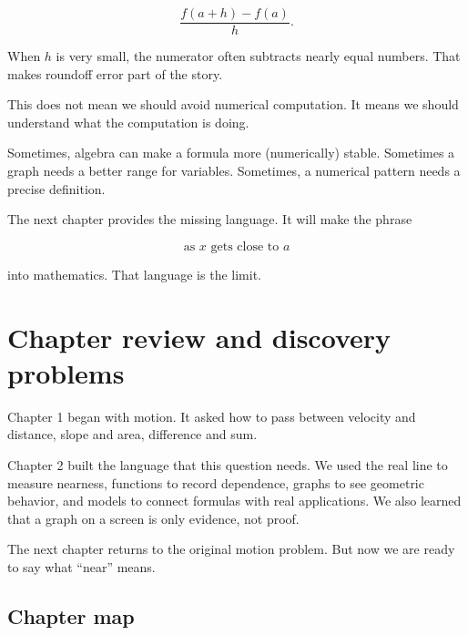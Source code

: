 \[
\frac{f(a+h)-f(a)}{h}.
\]

When \(h\) is very small, the numerator often subtracts nearly equal numbers. That makes roundoff error part of the story.

This does not mean we should avoid numerical computation. It means we should understand what the computation is doing.

Sometimes, algebra can make a formula more (numerically) stable. Sometimes a graph needs a better range for variables. Sometimes, a numerical pattern needs a precise definition.

The next chapter provides the missing language. It will make the phrase

\[
\text{as }x\text{ gets close to }a
\]

into mathematics. That language is the limit.
\section{Chapter review and discovery problems}
\label{sec:chapter-2-review}

Chapter 1 began with motion. It asked how to pass between velocity and distance, slope and area, difference and sum.

Chapter 2 built the language that this question needs. We used the real line to measure nearness, functions to record dependence, graphs to see geometric behavior, and models to connect formulas with real applications. We also learned that a graph on a screen is only evidence, not proof.

The next chapter returns to the original motion problem. But now we are ready to say what ``near'' means.

\subsection{Chapter map}
\label{subsec:chapter-2-map}


